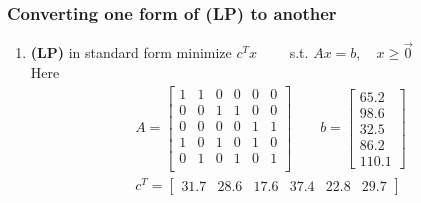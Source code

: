 \subsubsection*{Converting one form of (LP) to another}
\begin{enumerate}
\item \textbf{(LP)} in standard form \qquad minimize $ c^Tx \qquad$ s.t. $Ax = b, \quad x \geq \vec{0}$\\
Here
\begin{gather*}
	A = \begin{bmatrix}
		1 & 1 & 0 & 0 & 0 & 0\\
		0 & 0 & 1 & 1 & 0 & 0\\
		0 & 0 & 0 & 0 & 1 & 1\\
		1 & 0 & 1 & 0 & 1 & 0\\
		0 & 1 & 0 & 1 & 0 & 1\\
	\end{bmatrix} \qquad b = 
	\begin{bmatrix}
		65.2\\
		98.6\\
		32.5\\
		86.2\\
		110.1
	\end{bmatrix}\\
	c^T = \begin{bmatrix}
		31.7 & 28.6 & 17.6 & 37.4 & 22.8 & 29.7
	\end{bmatrix}
\end{gather*}



\end{enumerate}
